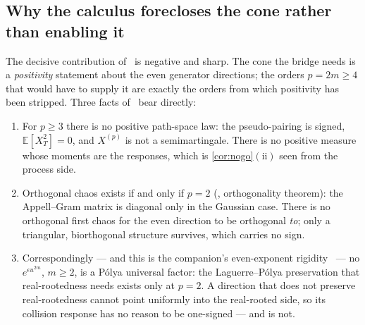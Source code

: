 \documentclass[11pt,reqno]{amsart}
\theoremstyle{plain}
\theoremstyle{definition}
\theoremstyle{remark}
\newcommand{\E}{\mathbb E}
\begin{document}
\subsection{Why the calculus forecloses the cone rather than enabling it}
The decisive contribution of~\cite{Fpseudo} is negative and sharp. The cone
the bridge needs is a \emph{positivity} statement about the even generator
directions; the orders $p=2m\ge4$ that would have to supply it are exactly
the orders from which positivity has been stripped. Three facts
of~\cite{Fpseudo} bear directly:
\begin{enumerate}
\item[$(\mathrm i)$] For $p\ge3$ there is no positive path-space law: the
pseudo-pairing is signed, $\E[X_T^2]=0$, and $X^{(p)}$ is not a
semimartingale. There is no positive measure whose moments are the responses,
which is \cref{cor:nogo}$(\mathrm{ii})$ seen from the process side.
\item[$(\mathrm{ii})$] Orthogonal chaos exists if and only if $p=2$
(\cite{Fpseudo}, orthogonality theorem): the Appell--Gram matrix is diagonal
only in the Gaussian case. There is no orthogonal first chaos for the even
direction to be orthogonal \emph{to}; only a triangular, biorthogonal
structure survives, which carries no sign.
\item[$(\mathrm{iii})$] Correspondingly --- and this is the companion's
even-exponent rigidity~\cite{Fsymbol} --- no $e^{\epsilon u^{2m}}$,
$m\ge2$, is a P\'olya universal factor: the Laguerre--P\'olya preservation
that real-rootedness needs exists only at $p=2$. A direction that does not
preserve real-rootedness cannot point uniformly into the real-rooted side,
so its collision response has no reason to be one-signed --- and is not.
\end{enumerate}
\end{document}
